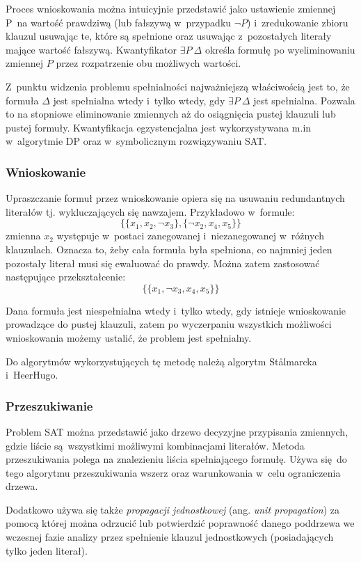 Proces wnioskowania można intuicyjnie przedstawić jako ustawienie zmiennej P~na wartość prawdziwą (lub fałszywą w~przypadku $\neg P$)
i~zredukowanie zbioru klauzul usuwając te, które są spełnione oraz usuwając z~pozostałych literały mające wartość fałszywą.
Kwantyfikator $\exists P~\Delta $ określa formułę po wyeliminowaniu zmiennej $P$ przez rozpatrzenie obu możliwych wartości.

Z~punktu widzenia problemu spełnialności najważniejszą właściwością jest to, że formuła $\Delta$ jest spełnialna wtedy i~tylko wtedy, gdy 
$\exists P~\Delta$ jest spełnialna. Pozwala to na stopniowe eliminowanie zmiennych aż do osiągnięcia pustej klauzuli lub pustej formuły. 
Kwantyfikacja egzystencjalna jest wykorzystywana m.in w~algorytmie DP oraz w~symbolicznym rozwiązywaniu SAT.

\subsubsection{Wnioskowanie}
Upraszczanie formuł przez wnioskowanie opiera się na usuwaniu redundantnych literałów tj. wykluczających się nawzajem.
Przykładowo w~formule:
\[ \{\{x_1, x_2, \neg x_3 \},  \{ \neg x_2, x_4, x_5 \}\} \]
zmienna $x_2$ występuje w~postaci zanegowanej i~niezanegowanej w~różnych klauzulach. Oznacza to, żeby cała formuła była spełniona,
co najmniej jeden pozostały literał musi się ewaluować do prawdy. Można zatem zastosować następujące przekształcenie:
  \[ \{\{x_1, \neg x_3, x_4, x_5 \}\} \]
  
Dana formuła jest niespełnialna wtedy i~tylko wtedy, gdy istnieje wnioskowanie prowadzące do pustej klauzuli, zatem po wyczerpaniu
wszystkich możliwości wnioskowania możemy ustalić, że problem jest spełnialny. 

Do algorytmów wykorzystujących tę metodę należą algorytm St{\aa}lmarcka i~HeerHugo.

\subsubsection{Przeszukiwanie}
Problem SAT można przedstawić jako drzewo decyzyjne przypisania zmiennych, gdzie liście są wszystkimi możliwymi kombinacjami literałów.
Metoda przeszukiwania polega na znalezieniu liścia spełniającego formułę. Używa się do tego algorytmu przeszukiwania wszerz oraz warunkowania
w~celu ograniczenia drzewa. 

Dodatkowo używa się także \textit{propagacji jednostkowej} (ang. \textit{unit propagation}) za pomocą której
można odrzucić lub potwierdzić poprawność danego poddrzewa we wczesnej fazie analizy przez spełnienie klauzul jednostkowych (posiadających tylko jeden literał).

